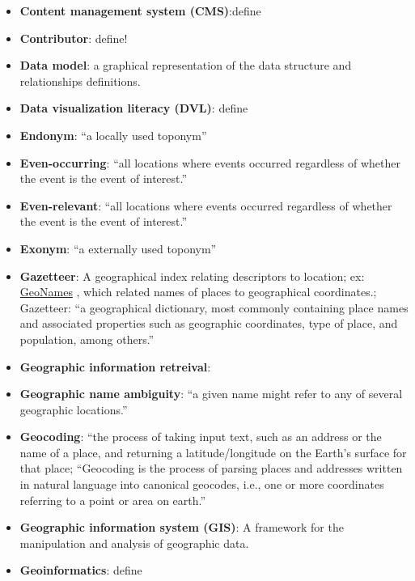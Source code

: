 \begin{itemize}
	\item[] \textbf{Content management system (CMS)}:{\color{red}define}\cite{Low2020}
	\item[] \textbf{Contributor}: {\color{red} define!}
	\item[] \textbf{Data model}: a graphical representation of the data structure and relationships definitions.
	\item[] \textbf{Data visualization literacy (DVL)}: {\color{red}define}\cite{Borner2019}
	\item[] \textbf{Endonym}: ``a locally used toponym'' \cite{Nordquist2018}
	\item[] \textbf{Even-occurring}:  {“all locations where events occurred regardless of whether the event is the event of interest.”\cite{Lee2019}}
	\item[] \textbf{Even-relevant}:{ “all locations where events occurred regardless of whether the event is the event of interest.”\cite{Lee2019}}
	\item[] \textbf{Exonym}: ``a externally used toponym'' \cite{Nordquist2018}
	\item[] \textbf{Gazetteer}: A geographical index relating descriptors to location; ex: \href{https://www.geonames.org/}{GeoNames} , which related names of places to geographical coordinates.; {Gazetteer: “a geographical dictionary, most commonly containing place names and associated properties such as geographic coordinates, type of place, and population, among others.”\cite{Karimzadeh2019a}}
	\item[] \textbf{Geographic information retreival}: {\cite{Karimzadeh2019a}}
	\item[] \textbf{Geographic name ambiguity}: { “a given name might refer to any of several geographic locations.” \cite{Teitler2008}}
	\item[] \textbf{Geocoding}: {``the process of taking input text, such as an address or the name of a place, and returning a latitude/longitude on the Earth's surface for that place\cite{Gupta2020}}; {“Geocoding is the process of parsing places and addresses written in natural language into canonical geocodes, i.e., one or more coordinates referring to a point or area on earth.”\cite{Hamborg2019}}
	\item[] \textbf{Geographic information system (GIS)}: A framework for the manipulation and analysis of geographic data.
	\item[] \textbf{Geoinformatics}: {\color{red}define}

\end{itemize}

